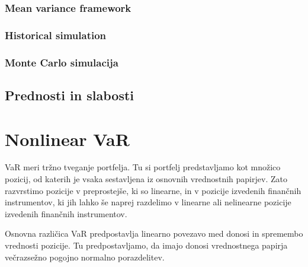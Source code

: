 \documentclass[12pt,a4paper]{amsart}
\theoremstyle{definition} %
\theoremstyle{definition}
\theoremstyle{definition}
\theoremstyle{definition}
\theoremstyle{plain} %
\begin{document}
\subsubsection{Mean variance framework}

\subsubsection{Historical simulation}


\subsubsection{Monte Carlo simulacija}

\subsection{Prednosti in slabosti}

\section{Nonlinear VaR}
VaR meri tržno tveganje portfelja. Tu si portfelj predstavljamo kot množico 
pozicij, od katerih je vsaka sestavljena iz osnovnih vrednostnih papirjev. Zato razvrstimo pozicije
v preprostejše, ki so linearne, in v pozicije izvedenih finančnih instrumentov, ki jih lahko še naprej
razdelimo v linearne ali nelinearne pozicije izvedenih finančnih instrumentov.


Osnovna različica VaR predpostavlja linearno povezavo med donosi in spremembo vrednosti pozicije.
Tu predpostavljamo, da imajo donosi vrednostnega papirja večrazsežno pogojno normalno porazdelitev.  
\end{document}
